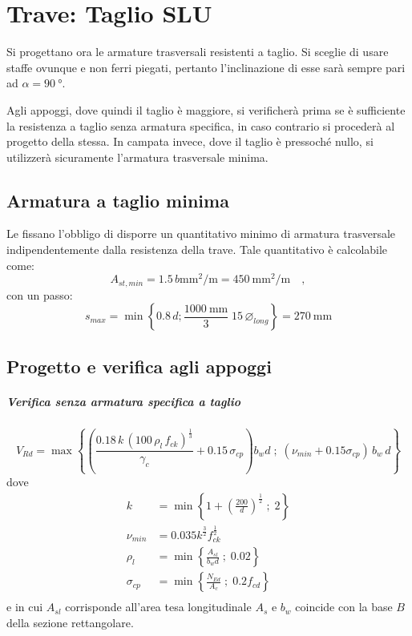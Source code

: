 \chapter{Trave: Taglio SLU}
Si progettano ora le armature trasversali resistenti a taglio. 
Si sceglie di usare staffe ovunque e non ferri piegati, pertanto l'inclinazione di esse sarà sempre pari ad $\alpha = \SI{90}{\degree}$.

Agli appoggi, dove quindi il taglio è maggiore, si verificherà prima se è sufficiente la resistenza a taglio senza armatura specifica, in caso contrario si procederà al progetto della stessa.
In campata invece, dove il taglio è pressoché nullo, si utilizzerà sicuramente l'armatura trasversale minima.

\section{Armatura a taglio minima}
Le  fissano l'obbligo di disporre un quantitativo minimo di armatura trasversale indipendentemente dalla resistenza della trave. 
Tale quantitativo è calcolabile come:
\begin{equation}
    A_{st, min} = \num{1.5} \, b \si{\milli\metre\squared\per\metre} = \SI{450}{\milli\metre\squared\per\metre} \quad ,
\end{equation}
con un passo:
\begin{equation}
    s_{max} = \min \left\{ 0.8\,d ; \frac{\SI{1000}{\milli\metre}}{3} \; 15\, \varnothing_{long} \right\} = \SI{270}{\milli\metre}
\end{equation} 

\section{Progetto e verifica agli appoggi}
\paragraph{Verifica senza armatura specifica a taglio}
\begin{equation}
    \label{eq:Taglio_only_cls}
    V_{Rd} = \max \left\{ \left(\frac{0.18 \, k \, (100 \, \rho_l \, f_{ck})^{\tfrac{1}{3}}}{\gamma_c} + 0.15 \, \sigma _{cp}\right) b_w d \; ; \;(\nu_{min} + 0.15\sigma _{cp}) \, b_w \, d \right\}
\end{equation}
dove 
\[
    \begin{split}
        k &= \min \left\{ 1 + \left(\frac{200}{d}\right)^ {\tfrac{1}{2}} \; ; \; 2\right\} \\
        \nu_{min} &= 0.035 k ^ \frac{3}{2} f_{ck}^ \frac{1}{2} \\
        \rho_l &= \min \left\{ \frac{A_{sl}}{b_w d} \; ; \; 0.02\right\} \\
        \sigma_{cp} &= \min \left\{ \frac{N_{Ed}}{A_c} \; ; \; 0.2 f_{cd} \right\} \\
    \end{split}
\]
e in cui $A_{sl}$ corrisponde all'area tesa longitudinale $A_s$ e $b_w$ coincide con la base $B$ della sezione rettangolare.

